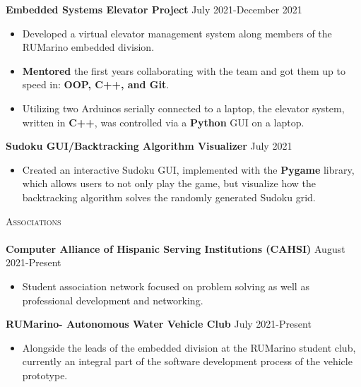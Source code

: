 \documentclass[a4paper]{article}
\newcommand{\lineunder} {
    \vspace*{-8pt} \\
    \hspace*{-18pt} \hrulefill \\
}
\newcommand{\header} [1] {
    {\hspace*{-18pt}\vspace*{6pt} \textsc{#1}}
    \vspace*{-6pt} \lineunder
}
\begin{document}
{\textbf{Embedded Systems Elevator Project}} \hfill \hfill July 2021-December 2021\\
\vspace{-1mm}

\begin{itemize} \itemsep -1pt
\item Developed a virtual elevator management system along members of the RUMarino embedded division.

\item \textbf{Mentored} the first years collaborating with the team and got them up to speed in: \textbf{OOP, C++, and Git}.

\item Utilizing two Arduinos serially connected to a laptop, the elevator system, written in \textbf{C++}, was controlled via a \textbf{Python} GUI on a laptop.\\
\end{itemize}
\vspace*{-0.5mm}

{\textbf{Sudoku GUI/Backtracking Algorithm Visualizer}} \hfill July 2021  \\
\vspace{-1.8mm}
\begin{itemize} \itemsep -1pt
\item Created an interactive Sudoku GUI, implemented with the \textbf{Pygame} library, which allows users to not only play the game, but visualize how the backtracking algorithm solves the randomly generated Sudoku grid.
\end{itemize}

\header{Associations}

\vspace{-1mm} \textbf{Computer Alliance of Hispanic Serving Institutions (CAHSI)} \hfill August 2021-Present\\
\begin{itemize} \itemsep -1pt
\vspace{-2mm}
\item Student association network focused on problem solving as well as professional development and networking. \\
\end{itemize}

\vspace{-2mm}
\textbf{RUMarino- Autonomous Water Vehicle Club} \hfill July 2021-Present \\ 
\vspace{-2mm}
\begin{itemize} \itemsep -1pt
\item Alongside the leads of the embedded division at the RUMarino student club, currently an integral part of the software development process of the vehicle prototype. \\ 
\end{itemize}
 


\ 
\end{document}
